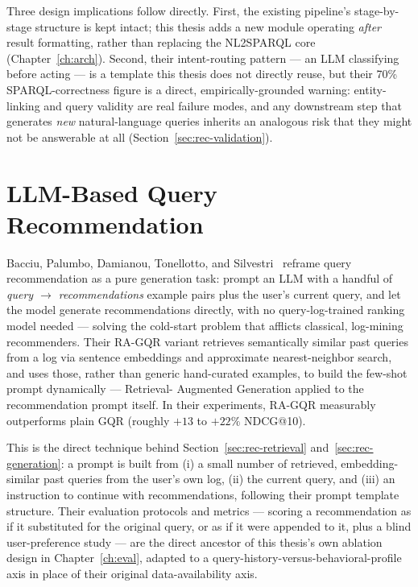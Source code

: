 \documentclass[11pt,a4paper,oneside]{book}
\begin{document}
Three design implications follow directly. First, the existing pipeline's stage-by-stage structure
is kept intact; this thesis adds a new module operating \emph{after} result formatting, rather than
replacing the NL2SPARQL core (Chapter~\ref{ch:arch}). Second, their intent-routing pattern --- an
LLM classifying before acting --- is a template this thesis does not directly reuse, but their
70\% SPARQL-correctness figure is a direct, empirically-grounded warning: entity-linking and query
validity are real failure modes, and any downstream step that generates \emph{new} natural-language
queries inherits an analogous risk that they might not be answerable at all
(Section~\ref{sec:rec-validation}).

\section{LLM-Based Query Recommendation}
\label{sec:rel-gqr}

Bacciu, Palumbo, Damianou, Tonellotto, and Silvestri~\cite{bacciu2024} reframe query recommendation
as a pure generation task: prompt an LLM with a handful of \emph{query $\to$ recommendations}
example pairs plus the user's current query, and let the model generate recommendations directly,
with no query-log-trained ranking model needed --- solving the cold-start problem that afflicts
classical, log-mining recommenders. Their RA-GQR variant retrieves semantically similar past
queries from a log via sentence embeddings and approximate nearest-neighbor search, and uses those,
rather than generic hand-curated examples, to build the few-shot prompt dynamically --- Retrieval-
Augmented Generation applied to the recommendation prompt itself. In their experiments, RA-GQR
measurably outperforms plain GQR (roughly $+13$ to $+22\%$ NDCG@10).

This is the direct technique behind Section~\ref{sec:rec-retrieval} and~\ref{sec:rec-generation}: a
prompt is built from (i) a small number of retrieved, embedding-similar past queries from the
user's own log, (ii) the current query, and (iii) an instruction to continue with recommendations,
following their prompt template structure. Their evaluation protocols and metrics --- scoring a
recommendation as if it substituted for the original query, or as if it were appended to it, plus
a blind user-preference study --- are the direct ancestor of this thesis's own ablation design in
Chapter~\ref{ch:eval}, adapted to a query-history-versus-behavioral-profile axis in place of their
original data-availability axis.
\end{document}
